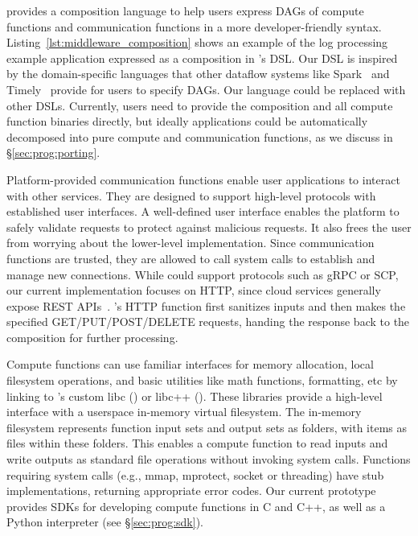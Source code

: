 \dandelion provides a composition language to help users express DAGs of compute functions and communication functions in a more developer-friendly syntax.
Listing~\ref{lst:middleware_composition} shows an example of the log processing example application expressed as a composition in \dandelion's DSL. Our DSL is inspired by the domain-specific languages that other dataflow systems like Spark~\cite{spark} and Timely~\cite{naiad} provide for users to specify DAGs.
Our language could be replaced with other DSLs.
Currently, users need to provide the composition and all compute function binaries directly, but ideally applications could be automatically decomposed into pure compute and communication functions, as we discuss in \S\ref{sec:prog:porting}.

\label{sec:prog:comm}
Platform-provided communication functions enable user applications to interact with other services. They are designed to support high-level protocols with established user interfaces.
A well-defined user interface enables the platform to safely validate requests to protect against malicious requests. It also frees the user from worrying about the lower-level implementation. Since communication functions are trusted, they are allowed to call system calls to establish and manage new connections. While \dandelion could support protocols such as gRPC or SCP, our current implementation focuses on HTTP, since cloud services generally expose REST APIs~\cite{restful_2013, rest-api}. \dandelion's HTTP function first sanitizes inputs and then makes the specified GET/PUT/POST/DELETE requests, handing the response back to the composition for further processing.

 \label{sec:prog:compute}
Compute functions can use familiar interfaces for memory allocation, local filesystem operations, and basic utilities like math functions, formatting, etc by linking to \dandelion's custom libc (\dlibc) or libc++ (\dlibcpp). These libraries provide a high-level interface with a userspace in-memory virtual filesystem.
The in-memory filesystem represents function input sets and output sets as folders, with items as files within these folders. This enables a compute function to read inputs and write outputs as standard file operations without invoking system calls. 
Functions requiring system calls (e.g., mmap, mprotect, socket or threading) have stub implementations, returning appropriate error codes.
Our current prototype provides SDKs for developing compute functions in C and C++, as well as a Python interpreter (see \S\ref{sec:prog:sdk}).

